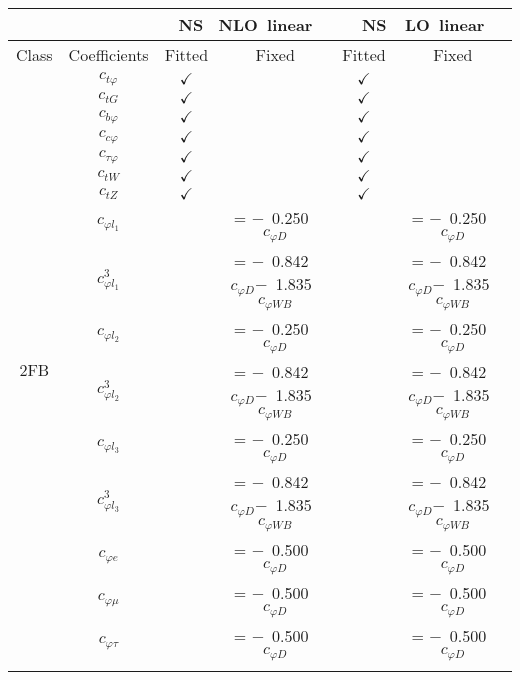 \documentclass{article}
\begin{document}
\begin{table}[H]
\centering
\begin{tabular}{|c|c|c|c|c|c|}
\hline
 &  & \multicolumn{2}{c|}{\rm NS \ NLO\ linear} & \multicolumn{2}{c|}{\rm NS\ \ LO\ linear} \\ \hline
Class & Coefficients & Fitted & Fixed  & Fitted & Fixed  \\ \hline
\multirow{24}{*}{2FB}
 & $c_{t \varphi}$ & $\checkmark$ &  & $\checkmark$ & \\ \cline{2-6}
 & $c_{tG}$ & $\checkmark$ &  & $\checkmark$ & \\ \cline{2-6}
 & $c_{b \varphi}$ & $\checkmark$ &  & $\checkmark$ & \\ \cline{2-6}
 & $c_{c \varphi}$ & $\checkmark$ &  & $\checkmark$ & \\ \cline{2-6}
 & $c_{\tau \varphi}$ & $\checkmark$ &  & $\checkmark$ & \\ \cline{2-6}
 & $c_{tW}$ & $\checkmark$ &  & $\checkmark$ & \\ \cline{2-6}
 & $c_{tZ}$ & $\checkmark$ &  & $\checkmark$ & \\ \cline{2-6}
 & $c_{\varphi l_1}$ & & = $-$\ 0.250\ $c_{\varphi D}$ & & = $-$\ 0.250\ $c_{\varphi D}$\\ \cline{2-6}
 & $c_{\varphi l_1}^{3}$ & & = $-$\ 0.842\ $c_{\varphi D}$$-$\ 1.835\ $c_{\varphi WB}$ & & = $-$\ 0.842\ $c_{\varphi D}$$-$\ 1.835\ $c_{\varphi WB}$\\ \cline{2-6}
 & $c_{\varphi l_2}$ & & = $-$\ 0.250\ $c_{\varphi D}$ & & = $-$\ 0.250\ $c_{\varphi D}$\\ \cline{2-6}
 & $c_{\varphi l_2}^{3}$ & & = $-$\ 0.842\ $c_{\varphi D}$$-$\ 1.835\ $c_{\varphi WB}$ & & = $-$\ 0.842\ $c_{\varphi D}$$-$\ 1.835\ $c_{\varphi WB}$\\ \cline{2-6}
 & $c_{\varphi l_3}$ & & = $-$\ 0.250\ $c_{\varphi D}$ & & = $-$\ 0.250\ $c_{\varphi D}$\\ \cline{2-6}
 & $c_{\varphi l_3}^{3}$ & & = $-$\ 0.842\ $c_{\varphi D}$$-$\ 1.835\ $c_{\varphi WB}$ & & = $-$\ 0.842\ $c_{\varphi D}$$-$\ 1.835\ $c_{\varphi WB}$\\ \cline{2-6}
 & $c_{\varphi e}$ & & = $-$\ 0.500\ $c_{\varphi D}$ & & = $-$\ 0.500\ $c_{\varphi D}$\\ \cline{2-6}
 & $c_{\varphi \mu}$ & & = $-$\ 0.500\ $c_{\varphi D}$ & & = $-$\ 0.500\ $c_{\varphi D}$\\ \cline{2-6}
 & $c_{\varphi \tau}$ & & = $-$\ 0.500\ $c_{\varphi D}$ & & = $-$\ 0.500\ $c_{\varphi D}$\\ \cline{2-6}

\end{tabular}
\end{table}
\end{document}
